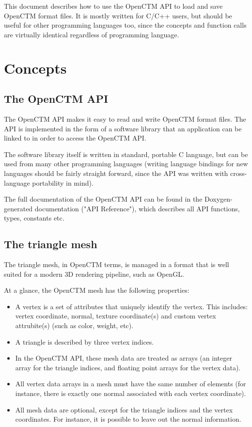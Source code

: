 This document describes how to use the OpenCTM API to load and save OpenCTM
format files. It is mostly written for C/C++ users, but should be useful for
other programming languages too, since the concepts and function calls are
virtually identical regardless of programming language.



\chapter{Concepts}

\section{The OpenCTM API}
The OpenCTM API makes it easy to read and write OpenCTM format files. The API is
implemented in the form of a software library that an application can be linked
to in order to access the OpenCTM API.

The software library itself is written in standard, portable C language, but
can be used from many other programming languages (writing language bindings
for new languages should be fairly straight forward, since the API was written
with cross-language portability in mind).

The full documentation of the OpenCTM API can be found in the Doxygen-generated
documentation ("API Reference"), which describes all API functions, types,
constants etc.


\section{The triangle mesh}
The triangle mesh, in OpenCTM terms, is managed in a format that is well suited
for a modern 3D rendering pipeline, such as OpenGL.

At a glance, the OpenCTM mesh has the following properties:

\begin{itemize}
    \item A vertex is a set of attributes that uniquely identify the vertex.
          This includes: vertex coordinate, normal, texture coordinate(s) and
          custom vertex attrubite(s) (such as color, weight, etc).
    \item A triangle is described by three vertex indices.
    \item In the OpenCTM API, these mesh data are treated as arrays (an integer
          array for the triangle indices, and floating point arrays for the
          vertex data).
    \item All vertex data arrays in a mesh must have the same number of elements
          (for instance, there is exactly one normal associated with each
          vertex coordinate).
    \item All mesh data are optional, except for the triangle indices and the
          vertex coordinates. For instance, it is possible to leave out the
          normal information.
\end{itemize}

